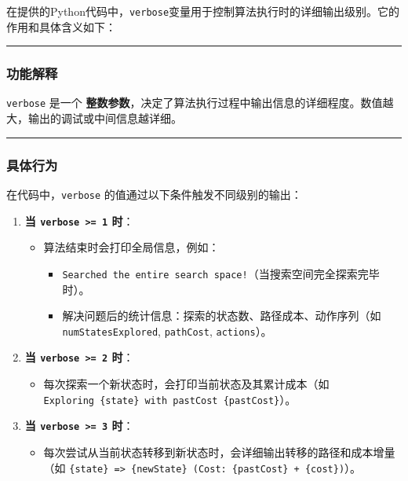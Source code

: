 \documentclass[
]{article}
\author{}
\date{}
\begin{document}
在提供的Python代码中，\texttt{verbose}变量用于控制算法执行时的详细输出级别。它的作用和具体含义如下：

\begin{center}\rule{0.5\linewidth}{0.5pt}\end{center}

\subsubsection{\texorpdfstring{\textbf{功能解释}}{功能解释}}\label{header-n4}

\texttt{verbose} 是一个
\textbf{整数参数}，决定了算法执行过程中输出信息的详细程度。数值越大，输出的调试或中间信息越详细。

\begin{center}\rule{0.5\linewidth}{0.5pt}\end{center}

\subsubsection{\texorpdfstring{\textbf{具体行为}}{具体行为}}\label{header-n7}

在代码中，\texttt{verbose} 的值通过以下条件触发不同级别的输出：

\begin{enumerate}
\def\labelenumi{\arabic{enumi}.}
\item
  \textbf{当 \texttt{verbose\ \textgreater{}=\ 1} 时}：

  \begin{itemize}
  \item
    算法结束时会打印全局信息，例如：

    \begin{itemize}
    \item
      \texttt{Searched\ the\ entire\ search\ space!}（当搜索空间完全探索完毕时）。
    \item
      解决问题后的统计信息：探索的状态数、路径成本、动作序列（如
      \texttt{numStatesExplored}, \texttt{pathCost},
      \texttt{actions}）。
    \end{itemize}
  \end{itemize}
\item
  \textbf{当 \texttt{verbose\ \textgreater{}=\ 2} 时}：

  \begin{itemize}
  \item
    每次探索一个新状态时，会打印当前状态及其累计成本（如
    \texttt{Exploring\ \{state\}\ with\ pastCost\ \{pastCost\}}）。
  \end{itemize}
\item
  \textbf{当 \texttt{verbose\ \textgreater{}=\ 3} 时}：

  \begin{itemize}
  \item
    每次尝试从当前状态转移到新状态时，会详细输出转移的路径和成本增量（如
    \texttt{\{state\}\ =\textgreater{}\ \{newState\}\ (Cost:\ \{pastCost\}\ +\ \{cost\})}）。
  \end{itemize}
\end{enumerate}
\end{document}
